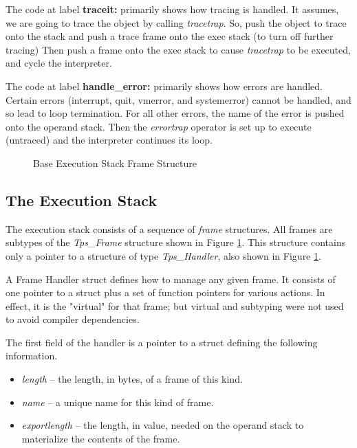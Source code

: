 The code at label {\bf traceit:} primarily shows how tracing is handled.
It assumes, we are going to trace the object by calling {\em tracetrap}.
So, push the object to trace onto the stack and
push a trace frame onto the exec stack (to turn off further tracing)
Then push a frame onto the exec stack to cause {\em tracetrap} to be executed,
and cycle the interpreter.

The code at label {\bf handle\_error:} primarily shows how errors are handled.
Certain errors (interrupt, quit, vmerror, and systemerror)
cannot be handled, and so lead to loop termination.
For all other errors, the name of the error is pushed onto the
operand stack.  Then the {\em errortrap} operator is set up
to execute (untraced) and the interpreter continues its loop.


\clearpage

\begin{figure}[b]\centering
\horizontalline

\caption{Base Execution Stack Frame Structure}
\label{execf1}
\end{figure}
\subsection{The Execution Stack}
\label{exec}
The execution stack consists of a sequence of {\em frame} structures.
All frames are subtypes of the {\em Tps\_Frame}
structure shown in Figure \ref{execf1}.
This structure contains only a pointer to a structure
of type {\em Tps\_Handler}, also shown in Figure \ref{execf1}.

A Frame Handler struct defines how to manage any given frame.
It consists of one pointer to a struct plus
a set of function pointers for various actions.
In effect, it is the "virtual" for that frame; but virtual
and subtyping were not used to avoid compiler dependencies.

The first field of the handler is a pointer to a struct
defining the following information.
\begin{itemize}
\item {\em length} --
the length, in bytes, of a frame of this kind.
\item {\em name} --
a unique name for this kind of frame.
\item {\em exportlength} --
the length, in value, needed on the operand stack
to materialize the contents of the frame.
\end{itemize}

